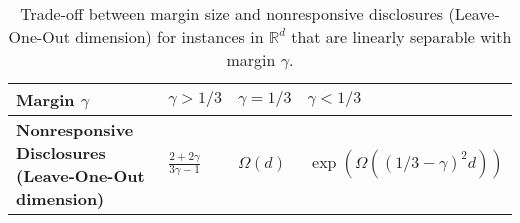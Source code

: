 \FloatBarrier
\begin{table}[ht]
    \centering
    \renewcommand{\arraystretch}{1.3}
    \begin{tabular}{|m{4.8cm}|m{2cm}|m{2cm}|m{4cm}|}
        \hline
        \textbf{Margin $\gamma$} & \textbf{$\gamma > 1/3$} & \textbf{$\gamma = 1/3$} & \textbf{$\gamma < 1/3$} \\
        \hline
        \textbf{Nonresponsive Disclosures (Leave-One-Out dimension)}  & $\frac{2 + 2\gamma}{3\gamma - 1}$ & $\Omega(d)$ & $\exp(\Omega((1/3-\gamma)^2d))$ \\
        \hline
    \end{tabular}
    \caption{Trade-off between margin size and nonresponsive disclosures (Leave-One-Out dimension) for instances in \(\mathbb{R}^d\) that are linearly separable with margin \(\gamma\).}
    \label{tab:margin_tradeoff}
\end{table}
\FloatBarrier


